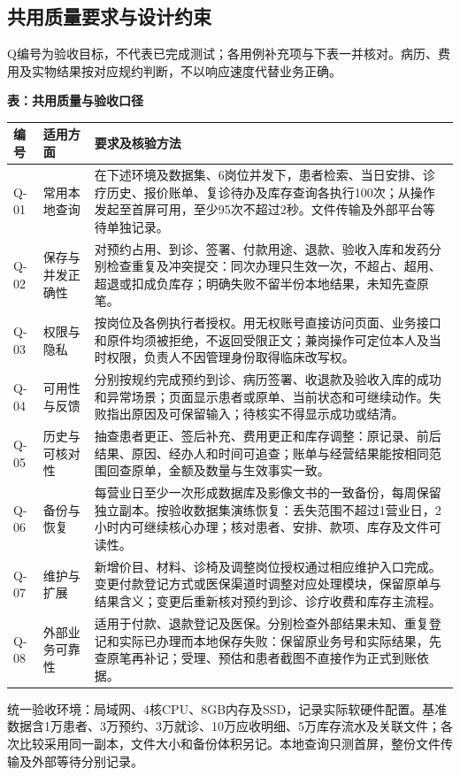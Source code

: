 \documentclass[UTF8,a4paper,zihao=-4,fontset=none]{ctexart}
\begin{document}
\subsection{共用质量要求与设计约束}
\label{sec:common-quality}
\begingroup\small\linespread{1.04}\selectfont
Q编号为验收目标，不代表已完成测试；各用例补充项与下表一并核对。病历、费用及实物结果按对应规约判断，不以响应速度代替业务正确。\par\smallskip
{\setlength{\tabcolsep}{3pt}\renewcommand{\arraystretch}{1.08}
\noindent\textbf{表\thetable：共用质量与验收口径}\par\smallskip
\noindent\begin{tabular}{@{}>{\raggedright\arraybackslash}p{1.45cm}>{\raggedright\arraybackslash}p{2.45cm}>{\raggedright\arraybackslash}p{11.8cm}@{}}
\toprule
编号 & 适用方面 & 要求及核验方法 \\ \midrule
Q-01 & 常用本地查询 & 在下述环境及数据集、6岗位并发下，患者检索、当日安排、诊疗历史、报价账单、复诊待办及库存查询各执行100次；从操作发起至首屏可用，至少95次不超过2秒。文件传输及外部平台等待单独记录。 \\
Q-02 & 保存与并发正确性 & 对预约占用、到诊、签署、付款用途、退款、验收入库和发药分别检查重复及冲突提交：同次办理只生效一次，不超占、超用、超退或扣成负库存；明确失败不留半份本地结果，未知先查原笔。 \\
Q-03 & 权限与隐私 & 按岗位及各例执行者授权。用无权账号直接访问页面、业务接口和原件均须被拒绝，不返回受限正文；兼岗操作可定位本人及当时权限，负责人不因管理身份取得临床改写权。 \\
Q-04 & 可用性与反馈 & 分别按规约完成预约到诊、病历签署、收退款及验收入库的成功和异常场景；页面显示患者或原单、当前状态和可继续动作。失败指出原因及可保留输入；待核实不得显示成功或结清。 \\
Q-05 & 历史与可核对性 & 抽查患者更正、签后补充、费用更正和库存调整：原记录、前后结果、原因、经办人和时间可追查；账单与经营结果能按相同范围回查原单，金额及数量与生效事实一致。 \\
Q-06 & 备份与恢复 & 每营业日至少一次形成数据库及影像文书的一致备份，每周保留独立副本。按验收数据集演练恢复：丢失范围不超过1营业日，2小时内可继续核心办理；核对患者、安排、款项、库存及文件可读性。 \\
Q-07 & 维护与扩展 & 新增价目、材料、诊椅及调整岗位授权通过相应维护入口完成。变更付款登记方式或医保渠道时调整对应处理模块，保留原单与结果含义；变更后重新核对预约到诊、诊疗收费和库存主流程。 \\
Q-08 & 外部业务可靠性 & 适用于付款、退款登记及医保。分别检查外部结果未知、重复登记和实际已办理而本地保存失败：保留原业务号和实际结果，先查原笔再补记；受理、预估和患者截图不直接作为正式到账依据。 \\
\bottomrule
\end{tabular}\par}
\medskip
统一验收环境：局域网、4核CPU、8GB内存及SSD，记录实际软硬件配置。基准数据含1万患者、3万预约、3万就诊、10万应收明细、5万库存流水及关联文件；各次比较采用同一副本，文件大小和备份体积另记。本地查询只测首屏，整份文件传输及外部等待分别记录。\par
\endgroup
\clearpage
\begingroup\small\linespread{1.04}\selectfont
\end{document}
